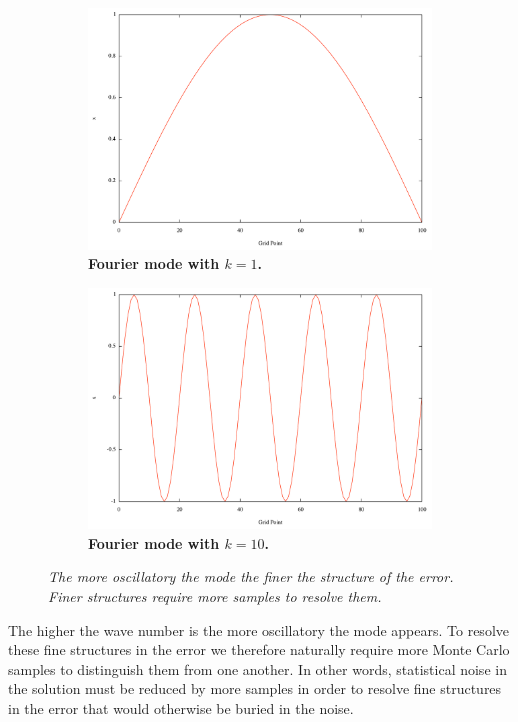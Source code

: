 \documentclass[note]{TechNote}
\begin{document}
\begin{figure}[h!]
  \centering
  \begin{subfigure}[b]{0.5\textwidth}
    \includegraphics[width=\textwidth]{mode_1.pdf}
    \caption{\textbf{Fourier mode with $k = 1$.}}
  \end{subfigure}
  \begin{subfigure}[b]{0.5\textwidth}
    \includegraphics[width=\textwidth]{mode_10.pdf}
    \caption{\textbf{Fourier mode with $k = 10$.}}
  \end{subfigure}
  \caption{\textit{The more oscillatory the mode the finer the
      structure of the error. Finer structures require more samples to
      resolve them.}}
  \label{fig:fourier_modes}
\end{figure}
The higher the wave number is the more oscillatory the mode
appears. To resolve these fine structures in the error we therefore
naturally require more Monte Carlo samples to distinguish them from
one another. In other words, statistical noise in the solution must be
reduced by more samples in order to resolve fine structures in the
error that would otherwise be buried in the noise.
\end{document}
